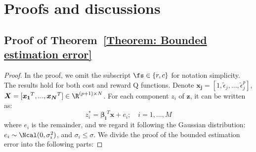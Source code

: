\newpage
\onecolumn


\clearpage
\section{Proofs and discussions}
\label{section: proof and discussions}

\subsection{Proof of Theorem~\ref{Theorem: Bounded estimation error}}
\label{proof: Bounded estimation error}
\begin{proof}
In the proof, we omit the subscript $\fs \in \{r, c\}$ for notation simplicity. The results hold for both cost and reward Q functions.
Denote $\boldsymbol{x_j} = [1, \tilde\epsilon_j, ..., \tilde\epsilon_j^p]$, $\boldsymbol{X}=[\boldsymbol{x_1}^T, ..., \boldsymbol{x_N}^T] \in \R^{(p+1)\times N}$. For each component $z_i$ of $\boldsymbol{z}$, it can be written as:
\begin{equation}
    z^*_i = \boldsymbol{\beta_i}^T \boldsymbol{x} + e_i; \quad i = 1, ..., M
\end{equation}
where $e_i$ is the remainder, and we regard it following the Gaussian distribution: $e_i \sim \Ncal(0, \sigma_i^2)$, and $\sigma_i \leq \sigma$. We divide the proof of the bounded estimation error into the following parts:
    

\end{proof}
